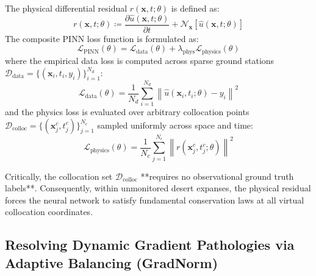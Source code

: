The physical differential residual $r(\mathbf{x}, t; \theta)$ is defined as:
\begin{equation}
\label{eq:pinn_residual}
r(\mathbf{x}, t; \theta) \coloneqq \frac{\partial \hat{u}(\mathbf{x}, t; \theta)}{\partial t} + \mathcal{N}_\mathbf{x}\left[\hat{u}(\mathbf{x}, t; \theta)\right]
\end{equation}
The composite PINN loss function is formulated as:
\begin{equation}
\label{eq:pinn_loss_formulation}
\mathcal{L}_{\text{PINN}}(\theta) = \mathcal{L}_{\text{data}}(\theta) + \lambda_{\text{phys}} \mathcal{L}_{\text{physics}}(\theta)
\end{equation}
where the empirical data loss is computed across sparse ground stations $\mathcal{D}_{\text{data}} = \{(\mathbf{x}_i, t_i, y_i)\}_{i=1}^{N_d}$:
\begin{equation}
\mathcal{L}_{\text{data}}(\theta) = \frac{1}{N_d} \sum_{i=1}^{N_d} \left\| \hat{u}(\mathbf{x}_i, t_i; \theta) - y_i \right\|^2
\end{equation}
and the physics loss is evaluated over arbitrary collocation points $\mathcal{D}_{\text{colloc}} = \{(\mathbf{x}_j^c, t_j^c)\}_{j=1}^{N_c}$ sampled uniformly across space and time:
\begin{equation}
\label{eq:pinn_colloc_loss}
\mathcal{L}_{\text{physics}}(\theta) = \frac{1}{N_c} \sum_{j=1}^{N_c} \left\| r(\mathbf{x}_j^c, t_j^c; \theta) \right\|^2
\end{equation}

Critically, the collocation set $\mathcal{D}_{\text{colloc}}$ **requires no observational ground truth labels**. Consequently, within unmonitored desert expanses, the physical residual forces the neural network to satisfy fundamental conservation laws at all virtual collocation coordinates.

\subsection{Resolving Dynamic Gradient Pathologies via Adaptive Balancing (GradNorm)}
\label{subsec:pinn_challenges}

